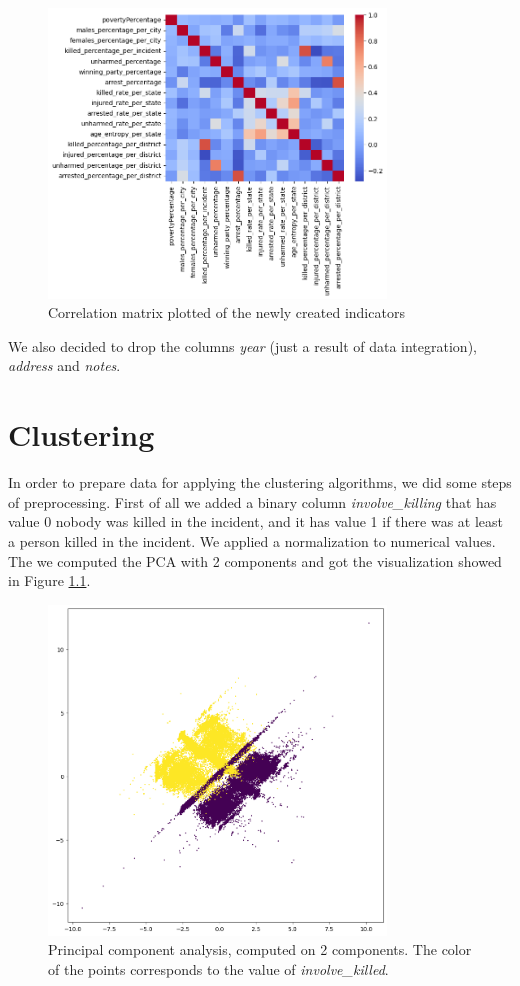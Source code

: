 \documentclass[10pt,a4paper]{report}
\begin{document}
\begin{figure}[h]
	\includegraphics[width=0.8\textwidth]{corr_matrix_indicators}
	\centering
	\caption{Correlation matrix plotted of the newly created indicators}
	\label{corr_matrix_indicators}
\end{figure}

We also decided to drop the columns \textit{year} (just a result of data integration), \textit{address} and \textit{notes}.

\chapter{Clustering}

In order to prepare data for applying the clustering algorithms, we did some steps of preprocessing.
First of all we added a binary column \textit{involve\_killing} that has value 0 nobody was killed in the incident, and it has value 1 if there was at least a person killed in the incident.
We applied a normalization to numerical values.
The we computed the PCA with 2 components and got the visualization showed in Figure \ref{pca}.

\begin{figure}[h]
	\includegraphics[width=0.8\textwidth]{pca}
	\centering
	\caption{Principal component analysis, computed on 2 components.
	The color of the points corresponds to the value of \textit{involve\_killed}.}
	\label{pca}
\end{figure}
\end{document}
